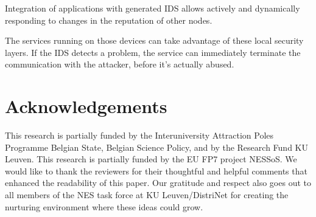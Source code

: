 \documentclass[conference]{IEEEtran}
\begin{document}
Integration of applications with generated IDS allows actively and dynamically
responding to changes in the reputation of other nodes.

The services running on those devices can take advantage of these local
security layers. If the IDS detects a problem, the service can immediately
terminate the communication with the attacker, before it's actually abused.

\section*{Acknowledgements}

This research is partially funded by the Interuniversity Attraction Poles
Programme Belgian State, Belgian Science Policy, and by the Research Fund KU
Leuven. This research is partially funded by the EU FP7 project NESSoS. We
would like to thank the reviewers for their thoughtful and helpful comments
that enhanced the readability of this paper. Our gratitude and respect also
goes out to all members of the NES task force at KU Leuven/DistriNet for
creating the nurturing environment where these ideas could grow.



\end{document}
